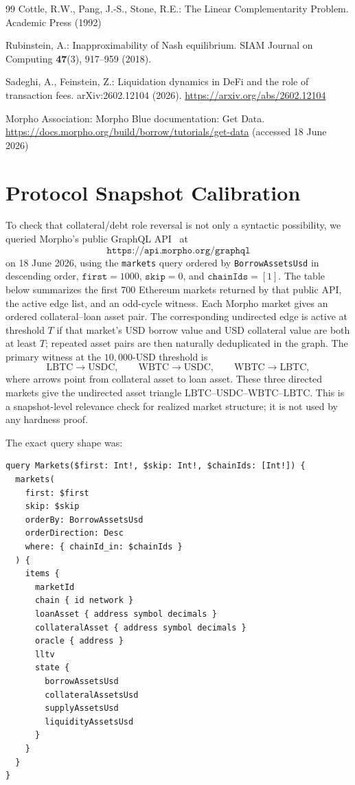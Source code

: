 \documentclass{llncs}
\begin{document}
\begin{thebibliography}{99}
Cottle, R.W., Pang, J.-S., Stone, R.E.:
The Linear Complementarity Problem.
Academic Press (1992)

Rubinstein, A.:
Inapproximability of Nash equilibrium.
SIAM Journal on Computing \textbf{47}(3), 917--959 (2018). 

Sadeghi, A., Feinstein, Z.:
Liquidation dynamics in DeFi and the role of transaction fees.
arXiv:2602.12104 (2026). \url{https://arxiv.org/abs/2602.12104}

Morpho Association:
Morpho Blue documentation: Get Data.
\url{https://docs.morpho.org/build/borrow/tutorials/get-data} (accessed 18 June 2026)

\end{thebibliography}

\clearpage
\appendix

\section{Protocol Snapshot Calibration}
\label{app:morpho}
To check that collateral/debt role reversal is not only a syntactic possibility, we queried Morpho's public GraphQL API~\cite{MorphoDocs} at
\[
        \texttt{https://api.morpho.org/graphql}
\]
on 18 June 2026, using the \texttt{markets} query ordered by \texttt{BorrowAssetsUsd} in descending order, \(\texttt{first}=1000\), \(\texttt{skip}=0\), and \(\texttt{chainIds}=[1]\). The table below summarizes the first 700 Ethereum markets returned by that public API, the active edge list, and an odd-cycle witness. Each Morpho market gives an ordered collateral--loan asset pair. The corresponding undirected edge is active at threshold \(T\) if that market's USD borrow value and USD collateral value are both at least \(T\); repeated asset pairs are then naturally deduplicated in the graph. The primary witness at the \(10{,}000\)-USD threshold is
\[
        \mathrm{LBTC}\to \mathrm{USDC},\qquad
        \mathrm{WBTC}\to \mathrm{USDC},\qquad
        \mathrm{WBTC}\to \mathrm{LBTC},
\]
where arrows point from collateral asset to loan asset. These three directed markets give the undirected asset triangle \(\mathrm{LBTC}\)--\(\mathrm{USDC}\)--\(\mathrm{WBTC}\)--\(\mathrm{LBTC}\). This is a snapshot-level relevance check for realized market structure; it is not used by any hardness proof.

The exact query shape was:
\begin{verbatim}
query Markets($first: Int!, $skip: Int!, $chainIds: [Int!]) {
  markets(
    first: $first
    skip: $skip
    orderBy: BorrowAssetsUsd
    orderDirection: Desc
    where: { chainId_in: $chainIds }
  ) {
    items {
      marketId
      chain { id network }
      loanAsset { address symbol decimals }
      collateralAsset { address symbol decimals }
      oracle { address }
      lltv
      state {
        borrowAssetsUsd
        collateralAssetsUsd
        supplyAssetsUsd
        liquidityAssetsUsd
      }
    }
  }
}
\end{verbatim}
\end{document}
